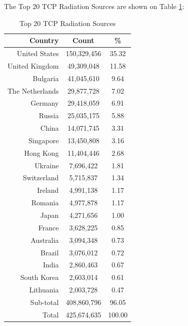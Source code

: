 \newpage
The Top 20 TCP Radiation Sources are shown on Table \ref{tab:top20tcpradiationsources}:
\begin{table}[!h]
\begin{center}
\caption{Top 20 TCP Radiation Sources}
\label{tab:top20tcpradiationsources}
\begin{tabular}{ |r|c|c| }
\hline
\centering Country & Count & \%  \\
\hline
United States & 150,329,456 & 35.32  \\
United Kingdom & 49,309,048 & 11.58  \\
Bulgaria & 41,045,610 & 9.64  \\
The Netherlands & 29,877,728 & 7.02  \\
Germany & 29,418,059 & 6.91  \\
Russia & 25,035,175 & 5.88  \\
China & 14,071,745 & 3.31  \\
Singapore & 13,450,808 & 3.16  \\
Hong Kong & 11,404,446 & 2.68  \\
Ukraine & 7,696,422 & 1.81  \\
Switzerland & 5,715,837 & 1.34  \\
Ireland & 4,991,138 & 1.17  \\
Romania & 4,977,878 & 1.17  \\
Japan & 4,271,656 & 1.00  \\
France & 3,628,225 & 0.85  \\
Australia & 3,094,348 & 0.73  \\
Brazil & 3,076,012 & 0.72  \\
India & 2,860,463 & 0.67  \\
South Korea & 2,603,014 & 0.61  \\
Lithuania & 2,003,728 & 0.47  \\
\hline
Sub-total & 408,860,796 & 96.05  \\
\hline
Total & 425,674,635 & 100.00  \\
\hline
\end{tabular}
\end{center}
\end{table}

